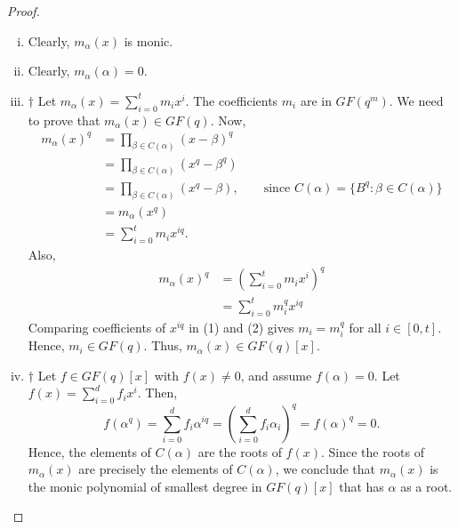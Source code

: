 \begin{proof}
    $ \; $

    \begin{enumerate}[(i)]
        \item Clearly, $ m_\alpha(x) $ is monic.
        \item Clearly, $ m_\alpha(\alpha)=0 $.
        \item $ \dagger $ Let $ m_\alpha(x)=\sum\limits_{i=0}^{t} m_ix^i $.
              The coefficients $ m_i $ are in $ GF(q^m) $. We need to prove that
              $ m_\alpha(x)\in GF(q) $. Now,
              \begin{equation}
                  \begin{aligned}
                      m_\alpha(x)^q
                       & =\prod_{\beta\in C(\alpha)}(x-\beta)^q                                                          \\
                       & =\prod_{\beta\in C(\alpha)}(x^q-\beta^q)                                                        \\
                       & =\prod_{\beta\in C(\alpha)}(x^q-\beta),\qquad \text{since }C(\alpha)=\{B^q:\beta\in C(\alpha)\} \\
                       & =m_\alpha(x^q)                                                                                  \\
                       & =\sum\limits_{i=0}^{t} m_i x^{iq}.
                  \end{aligned}\tag{1}
              \end{equation}
              Also,
              \begin{equation}
                  \begin{aligned}
                      m_\alpha(x)^q
                       & =\left( \sum\limits_{i=0}^{t} m_ix^i \right)^q \\
                       & = \sum\limits_{i=0}^{t} m_i^q x^{iq}
                  \end{aligned}\tag{2}
              \end{equation}
              Comparing coefficients of $ x^{iq} $ in (1) and (2) gives $ m_i=m_i^q $
              for all $ i\in[0,t] $. Hence, $ m_i\in GF(q) $. Thus, $ m_\alpha(x)\in GF(q)[x] $.
        \item $ \dagger $ Let $ f\in GF(q)[x] $ with $ f(x)\neq 0 $, and assume $ f(\alpha)=0 $.
              Let $ f(x)=\sum\limits_{i=0}^{d} f_ix^i $. Then,
              \[ f(\alpha^q)=\sum\limits_{i=0}^{d} f_i\alpha^{iq}=
                  \left( \sum\limits_{i=0}^{d} f_i\alpha_i \right)^q=f(\alpha)^q=0. \]
              Hence, the elements of $ C(\alpha) $ are the roots of $ f(x) $. Since the roots
              of $ m_\alpha(x) $ are precisely the elements of $ C(\alpha) $, we conclude
              that $ m_\alpha(x) $ is the monic polynomial of smallest degree in $ GF(q)[x] $
              that has $ \alpha $ as a root.
    \end{enumerate}
\end{proof}

